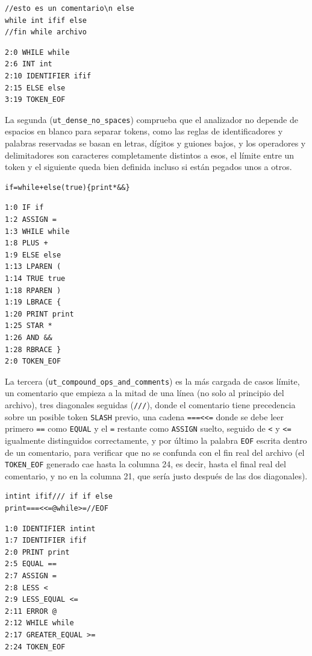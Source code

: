 \documentclass[12pt,letterpaper]{article}
\begin{document}
\begin{verbatim}
//esto es un comentario\n else
while int ifif else
//fin while archivo
\end{verbatim}

\begin{verbatim}
2:0 WHILE while
2:6 INT int
2:10 IDENTIFIER ifif
2:15 ELSE else
3:19 TOKEN_EOF
\end{verbatim}

La segunda (\texttt{ut\_dense\_no\_spaces}) comprueba que el analizador no depende de espacios en blanco para
separar tokens, como las reglas de identificadores y palabras reservadas se basan en letras, dígitos y guiones
bajos, y los operadores y delimitadores son caracteres completamente distintos a esos, el límite entre un
token y el siguiente queda bien definida incluso si están pegados unos a otros.

\begin{verbatim}
if=while+else(true){print*&&}
\end{verbatim}

\begin{verbatim}
1:0 IF if
1:2 ASSIGN =
1:3 WHILE while
1:8 PLUS +
1:9 ELSE else
1:13 LPAREN (
1:14 TRUE true
1:18 RPAREN )
1:19 LBRACE {
1:20 PRINT print
1:25 STAR *
1:26 AND &&
1:28 RBRACE }
2:0 TOKEN_EOF
\end{verbatim}

La tercera (\texttt{ut\_compound\_ops\_and\_comments}) es la más cargada de casos límite, un comentario que
empieza a la mitad de una línea (no solo al principio del archivo), tres diagonales seguidas (\texttt{///}),
donde el comentario tiene precedencia sobre un posible token \texttt{SLASH} previo, una cadena
\texttt{===<<=} donde se debe leer primero \texttt{==} como \texttt{EQUAL} y el \texttt{=} restante como
\texttt{ASSIGN} suelto, seguido de \texttt{<} y \texttt{<=} igualmente distinguidos correctamente, y por
último la palabra \texttt{EOF} escrita dentro de un comentario, para verificar que no se confunda con el fin
real del archivo (el \texttt{TOKEN\_EOF} generado cae hasta la columna 24, es decir, hasta el final real del
comentario, y no en la columna 21, que sería justo después de las dos diagonales).

\begin{verbatim}
intint ifif/// if if else
print===<<=@while>=//EOF
\end{verbatim}

\begin{verbatim}
1:0 IDENTIFIER intint
1:7 IDENTIFIER ifif
2:0 PRINT print
2:5 EQUAL ==
2:7 ASSIGN =
2:8 LESS <
2:9 LESS_EQUAL <=
2:11 ERROR @
2:12 WHILE while
2:17 GREATER_EQUAL >=
2:24 TOKEN_EOF
\end{verbatim}
\end{document}
